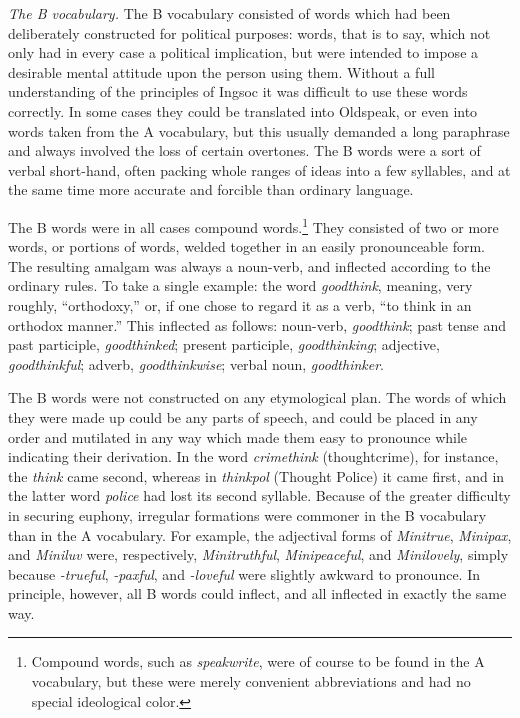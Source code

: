 \sectionbreak

\emph{The B vocabulary.} The B vocabulary consisted of words which had
been deliberately constructed for political purposes: words, that is to
say, which not only had in every case a political implication, but were
intended to impose a desirable mental attitude upon the person using
them. Without a full understanding of the principles of Ingsoc it was
difficult to use these words correctly. In some cases they could be
translated into Oldspeak, or even into words taken from the A
vocabulary, but this usually demanded a long paraphrase and always
involved the loss of certain overtones. The B words were a sort of
verbal short-hand, often packing whole ranges of ideas into a few
syllables, and at the same time more accurate and forcible than ordinary
language.

The B words were in all cases compound words.\footnote{Compound words, such
  as \emph{speakwrite}, were of course to be found in the A vocabulary, but
  these were merely convenient abbreviations and had no special ideological
  color.} They consisted of two or more words, or portions of words, welded
together in an easily pronounceable form. The resulting amalgam was always a
noun-verb, and inflected according to the ordinary rules. To take a single
example: the word \emph{goodthink}, meaning, very roughly, ``orthodoxy,''
or, if one chose to regard it as a verb, ``to think in an orthodox manner.''
This inflected as follows: noun-verb, \emph{goodthink}; past tense and past
participle, \emph{goodthinked}; present participle, \emph{goodthinking};
adjective, \emph{goodthinkful}; adverb, \emph{goodthinkwise}; verbal noun,
\emph{goodthinker}.

The B words were not constructed on any etymological plan. The words of
which they were made up could be any parts of speech, and could be
placed in any order and mutilated in any way which made them easy to
pronounce while indicating their derivation. In the word
\emph{crimethink} (thoughtcrime), for instance, the \emph{think} came
second, whereas in \emph{thinkpol} (Thought Police) it came first, and
in the latter word \emph{police} had lost its second syllable. Because
of the greater difficulty in securing euphony, irregular formations were
commoner in the B vocabulary than in the A vocabulary. For example, the
adjectival forms of \emph{Minitrue}, \emph{Minipax}, and \emph{Miniluv}
were, respectively, \emph{Minitruthful}, \emph{Minipeaceful}, and
\emph{Minilovely}, simply because \emph{-trueful}, \emph{-paxful}, and
\emph{-loveful} were slightly awkward to pronounce. In principle,
however, all B words could inflect, and all inflected in exactly the
same way.

